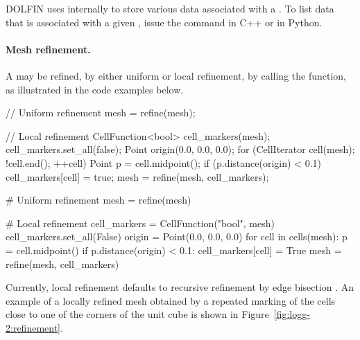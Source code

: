 DOLFIN uses  internally to store various data associated
with a . To list data that is associated with a given
, issue the command  in C++
or\break {} in Python.


\paragraph{Mesh refinement.}

A  may be refined, by either uniform or local refinement, by
calling the  function, as illustrated in the code examples
below.
\begin{c++}
// Uniform refinement
mesh = refine(mesh);

// Local refinement
CellFunction<bool> cell_markers(mesh);
cell_markers.set_all(false);
Point origin(0.0, 0.0, 0.0);
for (CellIterator cell(mesh); !cell.end(); ++cell)
{
  Point p = cell.midpoint();
  if (p.distance(origin) < 0.1)
    cell_markers[cell] = true;
}
mesh = refine(mesh, cell_markers);
\end{c++}
\begin{python}
# Uniform refinement
mesh = refine(mesh)

# Local refinement
cell_markers = CellFunction("bool", mesh)
cell_markers.set_all(False)
origin = Point(0.0, 0.0, 0.0)
for cell in cells(mesh):
    p = cell.midpoint()
    if p.distance(origin) < 0.1:
        cell_markers[cell] = True
mesh = refine(mesh, cell_markers)
\end{python}
Currently, local refinement defaults to recursive refinement by edge
bisection \citep{Rivara1984,Rivara1992}. An example of a locally refined
mesh obtained by a repeated marking of the cells close to one of the
corners of the unit cube is shown in Figure~\ref{fig:logg-2:refinement}.

